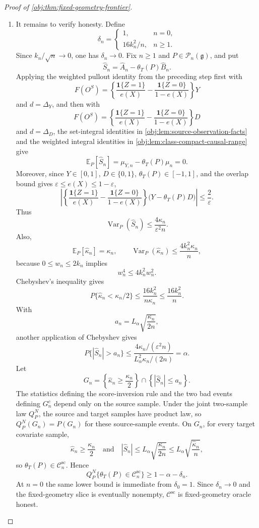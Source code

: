 \documentclass[11pt]{article}
\begin{document}
\begin{proof}[Proof of \cref{obj:thm:fixed-geometry-frontier}]
\begin{enumerate}
\item It remains to verify honesty.  Define
\[
\delta_n=
\begin{cases}
1, & n=0,\\
16k_n^2/n, & n\ge1 .
\end{cases}
\]
Since \(k_n/\sqrt n\to0\), one has \(\delta_n\to0\).  Fix \(n\ge1\) and \(P\in\mathcal P_n(\mathfrak g)\), and put
\[
\widehat S_n
=
\widehat A_n-\theta_T(P)\widehat B_n .
\]
Applying the weighted pullout identity from the preceding step first with
\[
F(O^S)=
\left\{\frac{\mathbf 1\{Z=1\}}{e(X)}
-
\frac{\mathbf 1\{Z=0\}}{1-e(X)}
\right\}Y
\]
and \(d=\Delta_Y\), and then with
\[
F(O^S)=
\left\{\frac{\mathbf 1\{Z=1\}}{e(X)}
-
\frac{\mathbf 1\{Z=0\}}{1-e(X)}
\right\}D
\]
and \(d=\Delta_D\), the set-integral identities in \cref{obj:lem:source-observation-facts} and the weighted integral identities in \cref{obj:lem:class-compact-causal-range} give
\[
\mathbb E_P[\widehat S_n]
=
\mu_{Y,n}-\theta_T(P)\mu_n
=
0.
\]
Moreover, since \(Y\in[0,1]\), \(D\in\{0,1\}\), \(\theta_T(P)\in[-1,1]\), and the overlap bound gives \(\varepsilon\le e(X)\le1-\varepsilon\),
\[
\left|
\left\{\frac{\mathbf 1\{Z=1\}}{e(X)}
-
\frac{\mathbf 1\{Z=0\}}{1-e(X)}
\right\}
\bigl(Y-\theta_T(P)D\bigr)
\right|
\le
\frac{2}{\varepsilon}.
\]
Thus
\[
\operatorname{Var}_P(\widehat S_n)
\le
\frac{4\kappa_n}{\varepsilon^2 n}.
\]
Also,
\[
\mathbb E_P[\widehat\kappa_n]=\kappa_n,
\qquad
\operatorname{Var}_P(\widehat\kappa_n)
\le
\frac{4k_n^2\kappa_n}{n},
\]
because \(0\le w_n\le2k_n\) implies
\[
w_n^4\le 4k_n^2w_n^2 .
\]
Chebyshev's inequality gives
\[
P\{\widehat\kappa_n<\kappa_n/2\}
\le
\frac{16k_n^2}{n\kappa_n}
\le
\frac{16k_n^2}{n}.
\]
With
\[
a_n=L_\alpha\sqrt{\frac{\kappa_n}{2n}},
\]
another application of Chebyshev gives
\[
P\{|\widehat S_n|>a_n\}
\le
\frac{4\kappa_n/(\varepsilon^2 n)}
{L_\alpha^2\kappa_n/(2n)}
=
\alpha .
\]
Let
\[
G_n=
\left\{\widehat\kappa_n\ge\frac{\kappa_n}{2}\right\}
\cap
\left\{|\widehat S_n|\le a_n\right\}.
\]
The statistics defining the score-inversion rule and the two bad events defining \(G_n^c\) depend only on the source sample.  Under the joint two-sample law \(Q_P^N\), the source and target samples have product law, so \(Q_P^N(G_n)=P(G_n)\) for these source-sample events.  On \(G_n\), for every target covariate sample,
\[
\widehat\kappa_n\ge \frac{\kappa_n}{2}
\quad\text{and}\quad
|\widehat S_n|
\le
L_\alpha\sqrt{\frac{\kappa_n}{2n}}
\le
L_\alpha\sqrt{\frac{\widehat\kappa_n}{n}},
\]
so \(\theta_T(P)\in\mathscr C_n^{\mathrm{sc}}\).  Hence
\[
Q_P^N\{\theta_T(P)\in\mathscr C_n^{\mathrm{sc}}\}
\ge
1-\alpha-\delta_n .
\]
At \(n=0\) the same lower bound is immediate from \(\delta_0=1\).  Since \(\delta_n\to0\) and the fixed-geometry slice is eventually nonempty, \(\mathscr C^{\mathrm{sc}}\) is fixed-geometry oracle honest.


\end{enumerate}
\end{proof}
\end{document}

